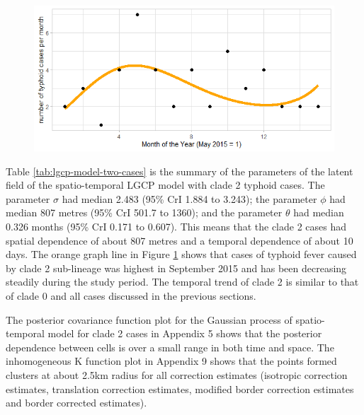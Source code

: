 \hspace*{2pt}

\begin{figure}[H]
    \begin{center}
        \includegraphics[scale=0.85]{Long term trend of temporal model - Major 2.png}
    \end{center}
     \label{fig:temporal-distribution-two-cases}
\end{figure}

Table \ref{tab:lgcp-model-two-cases} is the summary of the parameters of the latent field of the spatio-temporal LGCP model with clade 2 typhoid cases. The parameter $\sigma$ had median 2.483 (95\% CrI 1.884 to 3.243); the parameter $\phi$ had median 807 metres (95\% CrI 501.7 to 1360); and the parameter $\theta$ had median 0.326 months (95\% CrI 0.171 to 0.607). This means that the clade 2 cases had spatial dependence of about 807 metres and a temporal dependence of about 10 days. The orange graph line in Figure \ref{fig:temporal-distribution-two-cases} shows that cases of typhoid fever caused by clade 2 sub-lineage was highest in September 2015 and has been decreasing steadily during the study period. The temporal trend of clade 2 is similar to that of clade 0 and all cases discussed in the previous sections.

The posterior covariance function plot for the Gaussian process of spatio-temporal model for clade 2 cases in Appendix 5 shows that the posterior dependence between cells is over a small range in both time and space. The inhomogeneous K function plot in Appendix 9 shows that the points formed clusters at about 2.5km radius for all correction estimates (isotropic correction estimates, translation correction estimates, modified border correction estimates and border corrected estimates).

